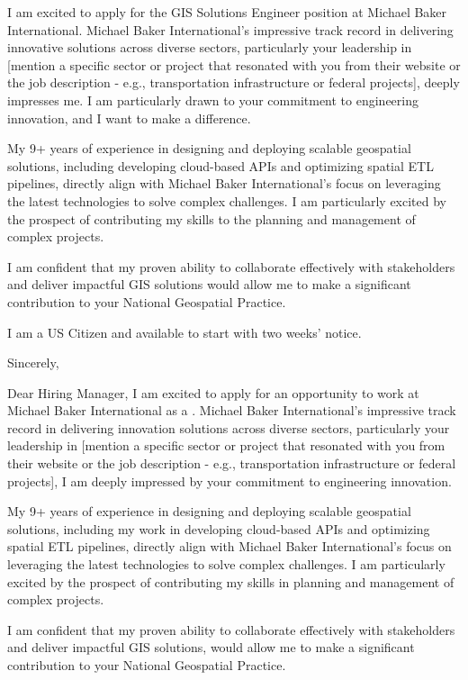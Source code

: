 \documentclass[letterpaper]{article}
\begin{document}
I am excited to apply for the GIS Solutions Engineer position at Michael Baker International. Michael Baker International's impressive track record in delivering innovative solutions across diverse sectors, particularly your leadership in [mention a specific sector or project that resonated with you from their website or the job description - e.g., transportation infrastructure or federal projects], deeply impresses me. I am particularly drawn to your commitment to engineering innovation, and I want to make a difference.

My 9+ years of experience in designing and deploying scalable geospatial solutions, including developing cloud-based APIs and optimizing spatial ETL pipelines, directly align with Michael Baker International's focus on leveraging the latest technologies to solve complex challenges. I am particularly excited by the prospect of contributing my skills to the planning and management of complex projects.

I am confident that my proven ability to collaborate effectively with stakeholders and deliver impactful GIS solutions would allow me to make a significant contribution to your National Geospatial Practice.

I am a US Citizen and available to start with two weeks' notice.

Sincerely,


Dear Hiring Manager,
I am excited to apply for an opportunity to work at Michael Baker International as a \JobTitle.
Michael Baker International's impressive track record in delivering innovation solutions across diverse sectors, 
particularly your leadership in [mention a
specific sector or project that resonated with you from their website or the
job description - e.g., transportation infrastructure or federal projects], I
am deeply impressed by your commitment to engineering innovation.

My 9+ years of experience in designing and deploying scalable geospatial solutions, including my work in developing cloud-based APIs and
optimizing spatial ETL pipelines, directly align with Michael Baker International's focus on leveraging the latest technologies to solve complex
challenges. 
I am particularly excited by the prospect of contributing my skills in planning and management of complex projects.

I am confident that my proven ability to
collaborate effectively with stakeholders and deliver impactful GIS solutions,
would allow me to make a significant contribution to your National Geospatial
Practice. 
\end{document}

